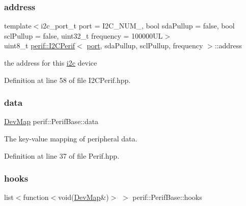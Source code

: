 \subsubsection{\texorpdfstring{address}{address}}
{\footnotesize\ttfamily template$<$i2c\+\_\+port\+\_\+t port = I2\+C\+\_\+\+N\+U\+M\+\_, bool sda\+Pullup = false, bool scl\+Pullup = false, uint32\+\_\+t frequency = 100000\+UL$>$ \\
uint8\+\_\+t \mbox{\hyperlink{classperif_1_1I2CPerif}{perif\+::\+I2\+C\+Perif}}$<$ \mbox{\hyperlink{classI2Cdev_a1d1e63732aa9f50369172b27a034129c}{port}}, sda\+Pullup, scl\+Pullup, frequency $>$\+::address\hspace{0.3cm}{\ttfamily [protected]}}

the address for this \mbox{\hyperlink{namespacei2c}{i2c}} device 

Definition at line 58 of file I2\+C\+Perif.\+hpp.

\mbox{\label{classperif_1_1PerifBase_a1a3afaa535fda17e9f97123fffe78765}} 
\subsubsection{\texorpdfstring{data}{data}}
{\footnotesize\ttfamily \mbox{\hyperlink{Perif_8hpp_a358ff4ee6d24694ee7661f0cce14377e}{Dev\+Map}} perif\+::\+Perif\+Base\+::data\hspace{0.3cm}{\ttfamily [inherited]}}

The key-\/value mapping of peripheral data. 

Definition at line 37 of file Perif.\+hpp.

\mbox{\label{classperif_1_1PerifBase_a98964e5ca8384df64881265e0aa6d7b6}} 
\subsubsection{\texorpdfstring{hooks}{hooks}}
{\footnotesize\ttfamily list$<$function$<$void(\mbox{\hyperlink{Perif_8hpp_a358ff4ee6d24694ee7661f0cce14377e}{Dev\+Map}}\&)$>$ $>$ perif\+::\+Perif\+Base\+::hooks\hspace{0.3cm}{\ttfamily [inherited]}}

